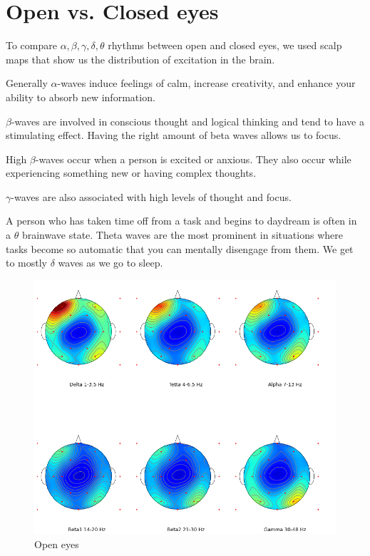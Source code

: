 \documentclass[9pt,twocolumn,twoside]{osajnl}
\begin{document}
\section{Open vs. Closed eyes}

To compare $\alpha, \beta, \gamma, \delta, \theta$ rhythms between open and closed eyes, we used scalp maps that show us the distribution of excitation in the brain. 

\par Generally $\alpha$-waves induce feelings of calm, increase creativity, and enhance your ability to absorb new information.
\par $\beta$-waves are involved in conscious thought and logical thinking and tend to have a stimulating effect. Having the right amount of beta waves allows us to focus.
\par High $\beta$-waves occur when a person is excited or anxious. They also occur while experiencing something new or having complex thoughts. 
\par $\gamma$-waves are also associated with high levels of thought and focus.

A person who has taken time off from a task and begins to daydream is often in a $\theta$ brainwave state. Theta waves are the most prominent in situations where tasks become so automatic that you can mentally disengage from them. We get to mostly $\delta$ waves as we go to sleep.

\begin{figure}[htbp]
\centering
\includegraphics[width=\linewidth]{image_2022-05-12_17-41-41.png}
\caption{Open eyes}
\label{fig:false-color}
\end{figure}
\end{document}
